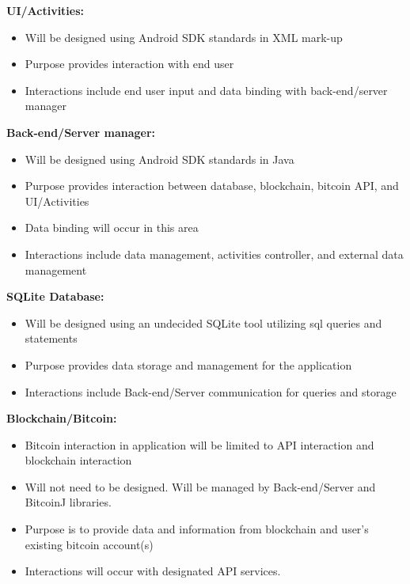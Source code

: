 \textbf{UI/Activities:}\\
\begin{itemize}
\item Will be designed using Android SDK standards in XML mark-up 
\item Purpose provides interaction with end user
\item Interactions include end user input and data binding with back-end/server manager\\
\end{itemize}

\textbf{Back-end/Server manager:}\\
\begin{itemize}
\item Will be designed using Android SDK standards in Java
\item Purpose provides interaction between database, blockchain, bitcoin API, and UI/Activities
\item Data binding will occur in this area
\item Interactions include data management, activities controller, and external data management\\
\end{itemize}

\textbf{SQLite Database:}\\
\begin{itemize}
\item Will be designed using an undecided SQLite tool utilizing sql queries and statements 
\item Purpose provides data storage and management for the application
\item Interactions include Back-end/Server communication for queries and storage\\
\end{itemize}

\textbf{Blockchain/Bitcoin:}\\
\begin{itemize}
\item Bitcoin interaction in application will be limited to API interaction and blockchain interaction
\item Will not need to be designed. Will be managed by Back-end/Server and BitcoinJ libraries.
\item Purpose is to provide data and information from blockchain and user's existing bitcoin account(s)
\item Interactions will occur with designated API services.\\
\end{itemize}


